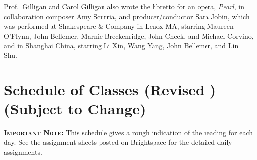 \documentclass[11pt,twoside]{jgsyllabus}\usepackage[]{graphicx}\usepackage[]{color}
\begin{document}
Prof.\ Gilligan and Carol Gilligan also wrote the libretto for an opera,
\emph{Pearl}, in collaboration composer Amy Scurria, and producer/conductor
Sara Jobin, which was performed at Shakespeare \& Company in Lenox MA,
starring Maureen O'Flynn, John Bellemer, Marnie Breckenridge, John Cheek,
and Michael Corvino, and in Shanghai China,
starring Li Xin, Wang Yang, John Bellemer, and Lin Shu.
%
%
%
%
%
%

\clearpage
\cleardoublepage
\appendix
\setcounter{secnumdepth}{0}
\newcommand{\maybehline}{\hline}%
\setlength\extrarowheight{4pt}
\section[Class Schedule]{Schedule of Classes
\ifrevised
	(Revised \RevisionDate)%
\else
	(Subject to Change)%
\fi}

\textbf{\scshape Important Note:} This schedule gives a rough indication of the
reading for each day. See the assignment sheets posted on Brightspace for the
detailed daily assignments.
\end{document}
